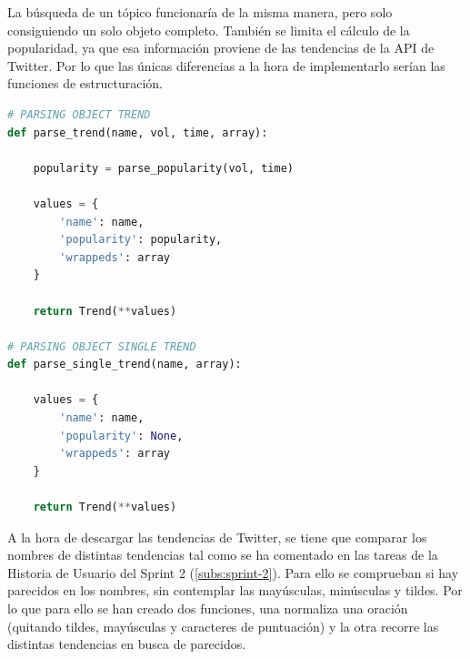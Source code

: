 La búsqueda de un tópico funcionaría de la misma manera, pero solo consiguiendo un solo objeto completo. También se limita el cálculo de la popularidad, ya que esa información proviene de las tendencias de la API de Twitter. Por lo que las únicas diferencias a la hora de implementarlo serían las funciones de estructuración.

\vspace{0.3cm}

\begin{lstlisting}[caption=Estructuración de la tendencia,          label={lst:listing-python},language=Python]
# PARSING OBJECT TREND
def parse_trend(name, vol, time, array):

    popularity = parse_popularity(vol, time)

    values = {
        'name': name,
        'popularity': popularity,
        'wrappeds': array
    }

    return Trend(**values)

# PARSING OBJECT SINGLE TREND
def parse_single_trend(name, array):

    values = {
        'name': name,
        'popularity': None,
        'wrappeds': array
    }

    return Trend(**values)
\end{lstlisting}

A la hora de descargar las tendencias de Twitter, se tiene que comparar los nombres de distintas tendencias tal como se ha comentado en las tareas de la Historia de Usuario del Sprint 2 (\ref{subs:sprint-2}). Para ello se comprueban si hay parecidos en los nombres, sin contemplar las mayúsculas, minúsculas y tildes. Por lo que para ello se han creado dos funciones, una normaliza una oración (quitando tildes, mayúsculas y caracteres de puntuación) y la otra recorre las distintas tendencias en busca de parecidos.

\vspace{0.3cm}

